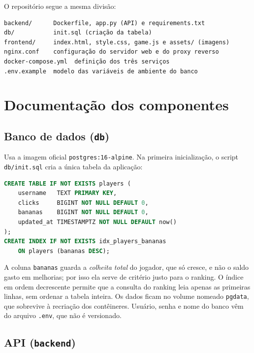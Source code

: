 \documentclass[12pt]{article}
\begin{document}
O repositório segue a mesma divisão:

\noindent\begin{minipage}{\linewidth}
\begin{lstlisting}
backend/      Dockerfile, app.py (API) e requirements.txt
db/           init.sql (criação da tabela)
frontend/     index.html, style.css, game.js e assets/ (imagens)
nginx.conf    configuração do servidor web e do proxy reverso
docker-compose.yml  definição dos três serviços
.env.example  modelo das variáveis de ambiente do banco
\end{lstlisting}
\end{minipage}

\section{Documentação dos componentes}\label{sec:componentes}

\subsection{Banco de dados (\texttt{db})}

Usa a imagem oficial \texttt{postgres:16-alpine}. Na primeira
inicialização, o script \texttt{db/init.sql} cria a única tabela da
aplicação:

\begin{lstlisting}[language=SQL]
CREATE TABLE IF NOT EXISTS players (
    username   TEXT PRIMARY KEY,
    clicks     BIGINT NOT NULL DEFAULT 0,
    bananas    BIGINT NOT NULL DEFAULT 0,
    updated_at TIMESTAMPTZ NOT NULL DEFAULT now()
);
CREATE INDEX IF NOT EXISTS idx_players_bananas
    ON players (bananas DESC);
\end{lstlisting}

A coluna \texttt{bananas} guarda a \emph{colheita total} do jogador, que
só cresce, e não o saldo gasto em melhorias; por isso ela serve de
critério justo para o ranking. O índice em ordem decrescente permite que a
consulta do ranking leia apenas as primeiras linhas, sem ordenar a tabela
inteira. Os dados ficam no volume nomeado \texttt{pgdata}, que sobrevive à
recriação dos contêineres. Usuário, senha e nome do banco vêm do arquivo
\texttt{.env}, que não é versionado.

\subsection{API (\texttt{backend})}
\end{document}
